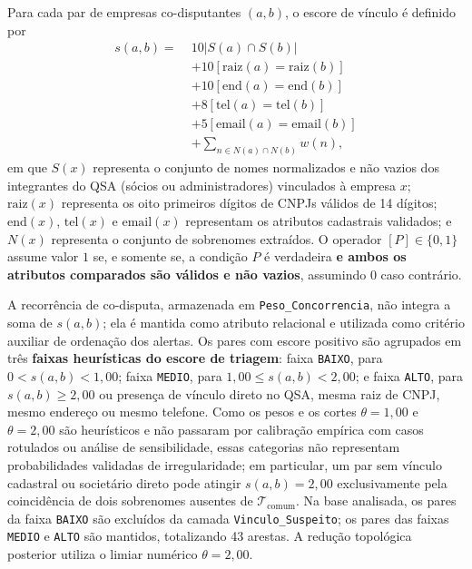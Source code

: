 Para cada par de empresas co-disputantes $(a,b)$, o escore de vínculo é definido por
\begin{equation}
\begin{aligned}
s(a,b)=\;&10|S(a)\cap S(b)|\\
&+10[\mathrm{raiz}(a)=\mathrm{raiz}(b)]\\
&+10[\mathrm{end}(a)=\mathrm{end}(b)]\\
&+8[\mathrm{tel}(a)=\mathrm{tel}(b)]\\
&+5[\mathrm{email}(a)=\mathrm{email}(b)]\\
&+\sum_{n\in N(a)\cap N(b)}w(n),
\end{aligned}
\label{eq:escore_vinculo}
\end{equation}
em que $S(x)$ representa o conjunto de nomes normalizados e não vazios dos integrantes do QSA (sócios ou administradores) vinculados à empresa $x$; $\mathrm{raiz}(x)$ representa os oito primeiros dígitos de CNPJs válidos de 14 dígitos; $\mathrm{end}(x)$, $\mathrm{tel}(x)$ e $\mathrm{email}(x)$ representam os atributos cadastrais validados; e $N(x)$ representa o conjunto de sobrenomes extraídos. O operador $[P]\in\{0,1\}$ assume valor $1$ se, e somente se, a condição $P$ é verdadeira \textbf{e ambos os atributos comparados são válidos e não vazios}, assumindo $0$ caso contrário.

A recorrência de co-disputa, armazenada em \texttt{Peso\_Concorrencia}, não integra a soma de $s(a,b)$; ela é mantida como atributo relacional e utilizada como critério auxiliar de ordenação dos alertas. Os pares com escore positivo são agrupados em três \textbf{faixas heurísticas do escore de triagem}: faixa \texttt{BAIXO}, para $0<s(a,b)<1{,}00$; faixa \texttt{MEDIO}, para $1{,}00\leq s(a,b)<2{,}00$; e faixa \texttt{ALTO}, para $s(a,b)\geq2{,}00$ ou presença de vínculo direto no QSA, mesma raiz de CNPJ, mesmo endereço ou mesmo telefone. Como os pesos e os cortes $\theta=1{,}00$ e $\theta=2{,}00$ são heurísticos e não passaram por calibração empírica com casos rotulados ou análise de sensibilidade, essas categorias não representam probabilidades validadas de irregularidade; em particular, um par sem vínculo cadastral ou societário direto pode atingir $s(a,b)=2{,}00$ exclusivamente pela coincidência de dois sobrenomes ausentes de $\mathcal{T}_{\mathrm{comum}}$. Na base analisada, os pares da faixa \texttt{BAIXO} são excluídos da camada \texttt{Vinculo\_Suspeito}; os pares das faixas \texttt{MEDIO} e \texttt{ALTO} são mantidos, totalizando 43 arestas. A redução topológica posterior utiliza o limiar numérico $\theta=2{,}00$.

